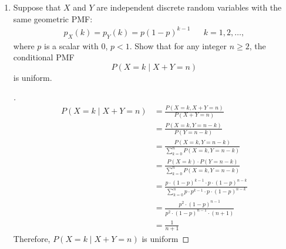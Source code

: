 \documentclass[paper=usletter, fontsize=12pt]{article}
\begin{document}
\begin{enumerate}[label=\textbf{\arabic*}.]
        \item
        Suppose that $X$ and $Y$ are independent discrete random variables with
        the same geometric PMF:
        \begin{align*}
            p_X(k)=p_Y(k)=p(1-p)^{k-1}&& k=1,2,\ldots,
        \end{align*}
        where $p$ is a scalar with $0$, $p<1$. Show that for any integer $n \ge
        2$, the conditional PMF
        \begin{equation*}
            P(X=k \mid X+Y=n)
        \end{equation*}
        is uniform.
        \begin{proof}[\unskip\nopunct]
            \begingroup
            \addtolength{\jot}{1em}
            \begin{align*}
                P(X=k \mid X+Y=n) & = \frac{P(X=k, X+Y=n)}{P(X+Y=n)} \\
                & = \frac{P(X=k, Y=n-k)}{P(Y=n-k)}\\
                & = \frac{P(X=k, Y=n-k)}{\sum_{k=0}^{n}P(X=k,Y=n-k)}\\
                & = \frac{P(X=k) \cdot P(Y=n-k)}{\sum_{k=0}^{n}P(X=k,Y=n-k)}\\
                & = \frac{p \cdot (1-p)^{k-1} \cdot p \cdot (1-p)^{n-k}}{\sum_{k=0}^{n}p \cdot p^{k-1} \cdot p \cdot (1-p)^{n-k}}\\
                & = \frac{p^2 \cdot (1-p)^{n-1}}{p^2 \cdot (1-p)^{n-1} \cdot (n+1)}\\
                & = \frac{1}{n+1}
            \end{align*}
            \endgroup
            Therefore, $P(X=k \mid X+Y=n)$ is uniform \qedhere
        \end{proof}
        \vspace{0.2in}


\end{enumerate}
\end{document}
